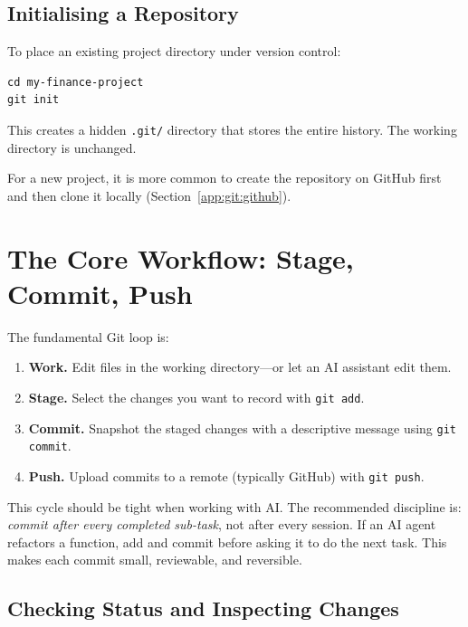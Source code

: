 \subsection{Initialising a Repository}
\label{app:git:init}

To place an existing project directory under version control:

\begin{verbatim}
cd my-finance-project
git init
\end{verbatim}

This creates a hidden \texttt{.git/} directory that stores the entire history.
The working directory is unchanged.

For a new project, it is more common to create the repository on GitHub first
and then clone it locally (Section~\ref{app:git:github}).

\section{The Core Workflow: Stage, Commit, Push}
\label{app:git:workflow}

\begin{context}
The fundamental Git loop is:

\begin{enumerate}
  \item \textbf{Work.}  Edit files in the working directory---or let an AI
        assistant edit them.
  \item \textbf{Stage.}  Select the changes you want to record with
        \texttt{git add}.
  \item \textbf{Commit.}  Snapshot the staged changes with a descriptive
        message using \texttt{git commit}.
  \item \textbf{Push.}  Upload commits to a remote (typically GitHub) with
        \texttt{git push}.
\end{enumerate}

This cycle should be tight when working with AI.  The recommended discipline
is: \emph{commit after every completed sub-task}, not after every session.
If an AI agent refactors a function, add and commit before asking it to do
the next task.  This makes each commit small, reviewable, and reversible.
\end{context}

\subsection{Checking Status and Inspecting Changes}
\label{app:git:status}

